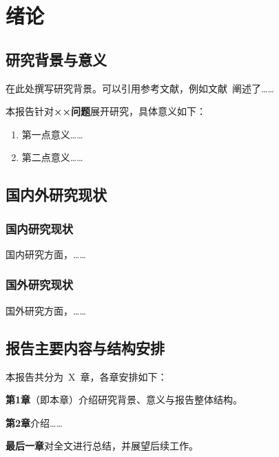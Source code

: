
\chapter{绪论}

\section{研究背景与意义}

在此处撰写研究背景。可以引用参考文献，例如文献~\cite{example2024}阐述了……

本报告针对\textbf{××问题}展开研究，具体意义如下：
\begin{enumerate}
    \item 第一点意义……
    \item 第二点意义……
\end{enumerate}

\section{国内外研究现状}

\subsection{国内研究现状}

国内研究方面，……

\subsection{国外研究现状}

国外研究方面，……

\section{报告主要内容与结构安排}

本报告共分为~X~章，各章安排如下：

\textbf{第1章}（即本章）介绍研究背景、意义与报告整体结构。

\textbf{第2章}介绍……

\textbf{最后一章}对全文进行总结，并展望后续工作。

